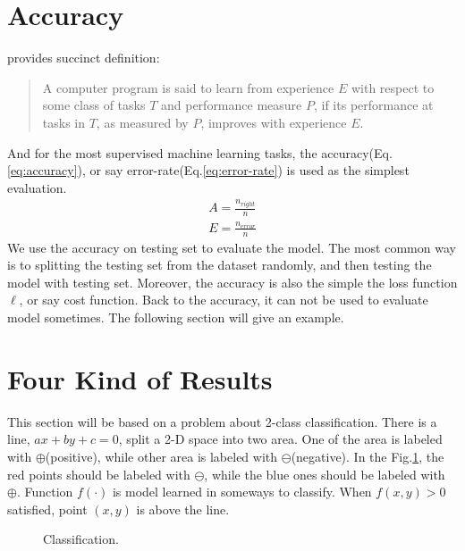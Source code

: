 \section{Accuracy}
\label{sec:accuracy}

\citep{Mitchell97} provides succinct definition:
\begin{quote}
    A computer program is said to learn from experience $E$ with respect to
    some class of tasks $T$ and performance measure $P$, if its performance
    at tasks in $T$, as measured by $P$, improves with experience $E$.
\end{quote}
And for the most supervised machine learning tasks, the accuracy(Eq.\ref{eq:accuracy}), or say error-rate(Eq.\ref{eq:error-rate})
is used as the simplest evaluation.
\begin{eqnarray}
    \label{eq:accuracy}
    A = \frac{n_{right}}{n} \\
    \label{eq:error-rate}
    E = \frac{n_{error}}{n}
\end{eqnarray}
We use the accuracy on testing set to evaluate the model.
The most common way is to splitting the testing set from the dataset randomly,
and then testing the model with testing set.
Moreover, the accuracy is also the simple the loss function $\ell$, or say cost function.
Back to the accuracy, it can not be used to evaluate model sometimes. The following section will
give an example.

\section{Four Kind of Results}
\label{sec:4rt}

This section will be based on a problem about 2-class classification.
There is a line,  $ax+by+c = 0$, split a 2-D space into two area.
One of the area is labeled with $\oplus$(positive), while other area is labeled with $\ominus$(negative).
In the Fig.\ref{fig:classification-1}, the red points should be labeled with $\ominus$, while
the blue ones should be labeled with $\oplus$.
Function $f(\cdot)$ is model learned in someways to classify. When $f(x,y) > 0$ satisfied,
point $(x,y)$ is above the line.
\begin{figure}
    \centering
    \caption{Classification.}
    \label{fig:classification-1}
\end{figure}

